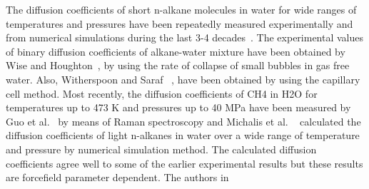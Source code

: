 \begin{sloppypar}
The diffusion coefficients of short n-alkane molecules in water for wide ranges of temperatures and pressures have been repeatedly measured experimentally and from numerical simulations during the last 3-4 decades~\citep{sachs1998diffusional, lu2006situ, price2000self, jahne1987measurement, maharajh1973temperature, witherspoon1969correlation}. The experimental values of binary diffusion coefficients of alkane-water mixture have been obtained by Wise and Houghton~\citep{wise1966diffusion}, by using the rate of collapse of small bubbles in gas free water. Also, Witherspoon and Saraf~ \citep{witherspoon1965diffusion}, have been obtained by using the capillary cell method. Most recently,
the diffusion coefficients of CH4 in H2O for temperatures up to 473 K and pressures up to
40 MPa have been measured by Guo et al.~\citep{guo2013situ} by means of Raman
spectroscopy and Michalis et al. ~\citep{michalis2016molecular} calculated the diffusion coefficients of light n-alkanes in water over a wide range of temperature and pressure by numerical simulation method. The calculated diffusion coefficients agree well to some of the earlier experimental results but these results are forcefield parameter dependent. The authors in ~\citep{michalis2016molecular}

\end{sloppypar}
